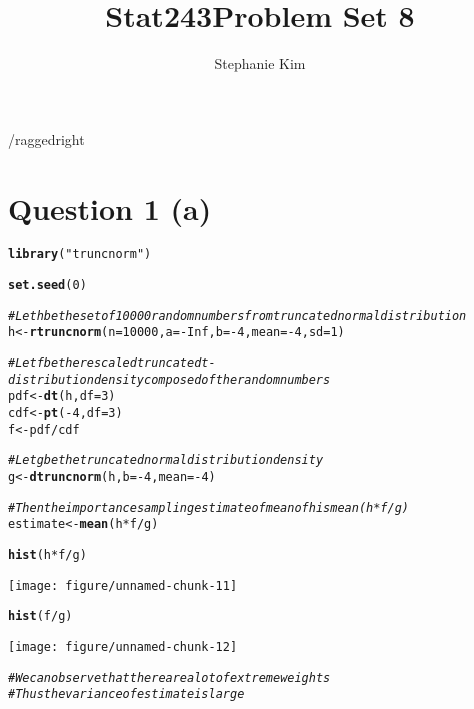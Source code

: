 \documentclass[english]{article}\usepackage[]{graphicx}\usepackage[]{color}
\makeatletter
\def\maxwidth{ %
  \ifdim\Gin@nat@width>\linewidth
    \linewidth
  \else
    \Gin@nat@width
  \fi
}
\newcommand{\hlnum}[1]{\textcolor[rgb]{0.686,0.059,0.569}{#1}}%
\newcommand{\hlstr}[1]{\textcolor[rgb]{0.192,0.494,0.8}{#1}}%
\newcommand{\hlcom}[1]{\textcolor[rgb]{0.678,0.584,0.686}{\textit{#1}}}%
\newcommand{\hlopt}[1]{\textcolor[rgb]{0,0,0}{#1}}%
\newcommand{\hlstd}[1]{\textcolor[rgb]{0.345,0.345,0.345}{#1}}%
\newcommand{\hlkwb}[1]{\textcolor[rgb]{0.69,0.353,0.396}{#1}}%
\newcommand{\hlkwc}[1]{\textcolor[rgb]{0.333,0.667,0.333}{#1}}%
\newcommand{\hlkwd}[1]{\textcolor[rgb]{0.737,0.353,0.396}{\textbf{#1}}}%
\newenvironment{kframe}{%
 \def\at@end@of@kframe{}%
 \ifinner\ifhmode%
  \def\at@end@of@kframe{\end{minipage}}%
  \begin{minipage}{\columnwidth}%
 \fi\fi%
 \def\FrameCommand##1{\hskip\@totalleftmargin \hskip-\fboxsep
 \colorbox{shadecolor}{##1}\hskip-\fboxsep
     \hskip-\linewidth \hskip-\@totalleftmargin \hskip\columnwidth}%
 \MakeFramed {\advance\hsize-\width
   \@totalleftmargin\z@ \linewidth\hsize
   \@setminipage}}%
 {\par\unskip\endMakeFramed%
 \at@end@of@kframe}
\newenvironment{knitrout}{}{} %
\makeatother
\begin{document}
\title{Stat243}


\title{Problem Set 8}


\author{Stephanie Kim}

\maketitle
/raggedright


\section*{Question 1 (a) }

\begin{knitrout}
\color{fgcolor}\begin{kframe}
\begin{alltt}
\hlkwd{library}\hlstd{(}\hlstr{"truncnorm"}\hlstd{)}

\hlkwd{set.seed}\hlstd{(}\hlnum{0}\hlstd{)}

\hlcom{# Let h be the set of 10000 random numbers from truncated normal distribution}
\hlstd{h} \hlkwb{<-} \hlkwd{rtruncnorm} \hlstd{(}\hlkwc{n}\hlstd{=}\hlnum{10000}\hlstd{,} \hlkwc{a}\hlstd{=}\hlopt{-}\hlnum{Inf}\hlstd{,} \hlkwc{b}\hlstd{=}\hlopt{-}\hlnum{4}\hlstd{,} \hlkwc{mean}\hlstd{=}\hlopt{-}\hlnum{4}\hlstd{,} \hlkwc{sd}\hlstd{=}\hlnum{1}\hlstd{)}

\hlcom{# Let f be the rescaled truncated t-distribution density composed of the random numbers }
\hlstd{pdf} \hlkwb{<-} \hlkwd{dt}\hlstd{(h,} \hlkwc{df}\hlstd{=}\hlnum{3}\hlstd{)}
\hlstd{cdf} \hlkwb{<-} \hlkwd{pt}\hlstd{(}\hlopt{-}\hlnum{4}\hlstd{,} \hlkwc{df}\hlstd{=}\hlnum{3}\hlstd{)}
\hlstd{f} \hlkwb{<-} \hlstd{pdf}\hlopt{/}\hlstd{cdf}

\hlcom{# Let g be the truncated normal distribution density}
\hlstd{g} \hlkwb{<-} \hlkwd{dtruncnorm}\hlstd{(h,} \hlkwc{b}\hlstd{=}\hlopt{-}\hlnum{4}\hlstd{,} \hlkwc{mean}\hlstd{=}\hlopt{-}\hlnum{4}\hlstd{)}

\hlcom{# Then the importance sampling estimate of mean of h is mean(h*f/g)}
\hlstd{estimate} \hlkwb{<-} \hlkwd{mean}\hlstd{(h}\hlopt{*}\hlstd{f}\hlopt{/}\hlstd{g)}

\hlkwd{hist}\hlstd{(h}\hlopt{*}\hlstd{f}\hlopt{/}\hlstd{g)}
\end{alltt}
\end{kframe}
\texttt{[image: figure/unnamed-chunk-11]} 
\begin{kframe}\begin{alltt}
\hlkwd{hist}\hlstd{(f}\hlopt{/}\hlstd{g)}
\end{alltt}
\end{kframe}
\texttt{[image: figure/unnamed-chunk-12]} 
\begin{kframe}\begin{alltt}
\hlcom{# We can observe that there are a lot of extreme weights}
\hlcom{# Thus the variance of estimate is large}
\end{alltt}
\end{kframe}
\end{knitrout}
\end{document}
